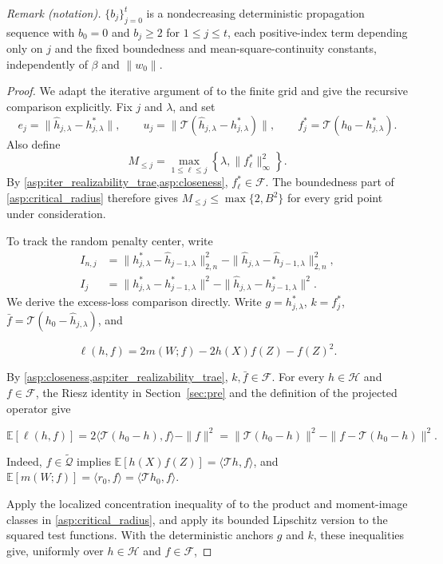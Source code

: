 \noindent\textit{Remark (notation).} $\{b_j\}_{j=0}^t$ is a nondecreasing deterministic propagation sequence with $b_0=0$ and $b_j\geqslant2$ for $1\leqslant j\leqslant t$, each positive-index term depending only on $j$ and the fixed boundedness and mean-square-continuity constants, independently of $\beta$ and $\|w_0\|$.

\begin{proof}
We adapt the iterative argument of \citet[Theorem~6]{bennett2023source} to the finite grid and give the recursive comparison explicitly. Fix $j$ and $\lambda$, and set
\[
e_j=\|\hat h_{j,\lambda}-h_{j,\lambda}^*\|,
\qquad
u_j=\|\mathcal T(\hat h_{j,\lambda}-h_{j,\lambda}^*)\|,
\qquad
f_j^*=\mathcal T(h_0-h_{j,\lambda}^*).
\]
Also define
\[
M_{\leqslant j} =\max_{1\leqslant\ell\leqslant j}
\left\{\lambda,\|f_\ell^*\|_\infty^2\right\}.
\]
By \cref{asp:iter_realizability_trae,asp:closeness}, $f_\ell^*\in\mathcal F$. The boundedness part of \cref{asp:critical_radius} therefore gives
$M_{\leqslant j}\leqslant\max\{2,B^2\}$ for every grid point under
consideration.

To track the random penalty center, write
\begin{align*}
I_{n,j}
&=\|h_{j,\lambda}^*-\hat h_{j-1,\lambda}\|_{2,n}^2
-\|\hat h_{j,\lambda}-\hat h_{j-1,\lambda}\|_{2,n}^2,\\
I_j
&=\|h_{j,\lambda}^*-h_{j-1,\lambda}^*\|^2
-\|\hat h_{j,\lambda}-h_{j-1,\lambda}^*\|^2.
\end{align*}
We derive the excess-loss comparison directly. Write $g=h_{j,\lambda}^*$, $k=f_j^*$, $\bar f=\mathcal T(h_0-\hat h_{j,\lambda})$, and

\[
\ell(h,f)=2m(W;f)-2h(X)f(Z)-f(Z)^2.
\]

By \cref{asp:closeness,asp:iter_realizability_trae}, $k,\bar f\in\mathcal F$. For every $h\in\mathcal H$ and $f\in\mathcal F$, the Riesz identity in Section~\ref{sec:pre} and the definition of the projected operator give

\[
\mathbb E[\ell(h,f)]
=2\langle\mathcal T(h_0-h),f\rangle-\|f\|^2
=\|\mathcal T(h_0-h)\|^2-\|f-\mathcal T(h_0-h)\|^2.
\]

Indeed, $f\in\widetilde{\mathcal Q}$ implies $\mathbb E[h(X)f(Z)]=\langle\mathcal T h,f\rangle$, and $\mathbb E[m(W;f)]=\langle r_0,f\rangle=\langle\mathcal T h_0,f\rangle$. 

Apply the localized concentration inequality of \citet[Lemma~9]{bennett2023source} to the product and moment-image classes in \cref{asp:critical_radius}, and apply its bounded Lipschitz version to the squared test functions. With the deterministic anchors $g$ and $k$, these inequalities give, uniformly over $h\in\mathcal H$ and $f\in\mathcal F$,


\end{proof}
